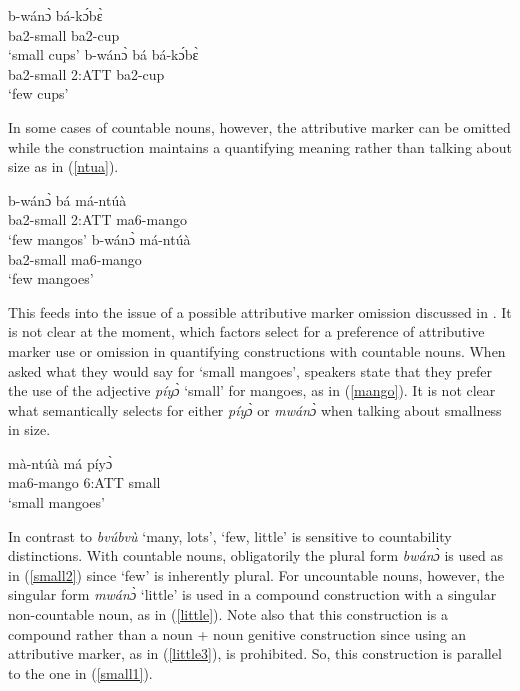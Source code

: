 \begin{exe}
\ex\label{small}
\begin{xlist}
\ex \label{small1}
  \gll     b-wánɔ̀ bá-kɔ́bɛ̀  \\
                ba2-small ba2-cup \\
    \trans `small cups'
\ex\label{small2}
 \gll     b-wánɔ̀ bá bá-kɔ́bɛ̀  \\
             ba2-small 2:ATT ba2-cup  \\
    \trans `few cups'
\end {xlist}
\end {exe}

\noindent In some cases of countable nouns, however, the attributive marker can be omitted while the construction maintains a quantifying meaning rather than talking about size as in (\ref{ntua}).

\begin{exe}
\ex\label{ntua}
\begin{xlist}
\ex \label{ntua1}
  \gll     b-wánɔ̀ bá má-ntúà  \\
                ba2-small 2:ATT ma6-mango \\
    \trans `few mangos'
\ex\label{ntua2}
 \gll    b-wánɔ̀ má-ntúà  \\
             ba2-small ma6-mango  \\
    \trans `few mangoes'
\end {xlist}
\end {exe}

\noindent This feeds into the issue of a possible attributive marker omission discussed in . It is not clear at the moment, which factors select for a preference of attributive marker use or omission in quantifying constructions with countable nouns. When asked what they would say for `small mangoes', speakers state that they prefer the use of the adjective {\itshape píyɔ̀} `small' for mangoes, as in (\ref{mango}). It is not clear what semantically selects for either {\itshape píyɔ̀} or {\itshape mwánɔ̀} when talking about smallness in size.

\begin{exe}
\ex\label{mango}
  \gll     mà-ntúà má píyɔ̀ \\
                ma6-mango 6:ATT small \\
    \trans `small mangoes'
\end {exe}

In contrast to {\itshape bvúbvù} `many, lots', `few, little' is sensitive to countability distinctions. With countable nouns, obligatorily the plural form {\itshape bwánɔ̀} is used as in (\ref{small2}) since `few' is inherently plural. For uncountable nouns, however, the singular form {\itshape mwánɔ̀} `little' is used in a compound construction with a singular non-countable noun, as in (\ref{little}). Note also that this construction is a compound rather than a noun + noun genitive construction since using an attributive marker, as in (\ref{little3}), is prohibited. So, this construction is parallel to the one in (\ref{small1}). 

